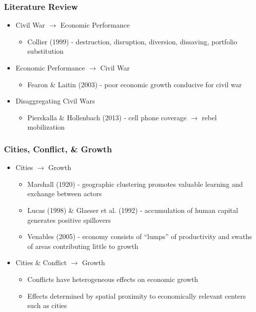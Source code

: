 \begin{frame}
\frametitle{Literature Review}

\begin{itemize}
	\item Civil War $\rightarrow$ Economic Performance
	\begin{itemize}
	\item Collier (1999) - destruction, disruption, diversion, dissaving, portfolio substitution
	\end{itemize}
	\pause
	\item Economic Performance $\rightarrow$ Civil War
	\begin{itemize}
	\item Fearon \& Laitin (2003) - poor economic growth conducive for civil war
	\end{itemize}
	\pause
	\item Disaggregating Civil Wars
	\begin{itemize}
	\item Pierskalla \& Hollenbach (2013) - cell phone coverage $\rightarrow$ rebel mobilization
	\end{itemize}
\end{itemize}

\end{frame}

\begin{frame}
\frametitle{Cities, Conflict, \& Growth}

\begin{itemize}
	\item Cities $\rightarrow$ Growth
	\begin{itemize}
	\item Marshall (1920) - geographic clustering promotes valuable learning and exchange between actors
	\pause
	\item Lucas (1998) \& Glaeser et al. (1992) - accumulation of human capital generates positive spillovers
	\pause
	\item Venables (2005) - economy consists of ``lumps'' of productivity and swaths of areas contributing little to growth	
	\end{itemize}
	\pause
	\item Cities \& Conflict $\rightarrow$ Growth
	\begin{itemize}
	\item Conflicts have heterogeneous effects on economic growth 
	\item Effects determined by spatial proximity to economically relevant centers such as cities
	\end{itemize}
\end{itemize}

\end{frame}

